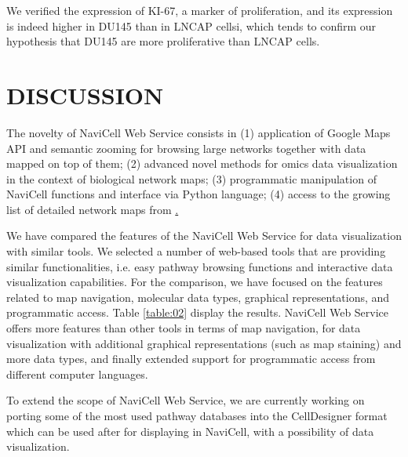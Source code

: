 \documentclass[a4,center,fleqn]{NAR}
\begin{document}
We verified the expression of KI-67, a marker of proliferation, and its
expression is indeed higher in DU145 than in LNCAP cellsi, which tends to
confirm our hypothesis that DU145 are more proliferative than LNCAP cells.


\section{DISCUSSION}

The novelty of NaviCell Web Service consists in (1) application of Google Maps API and semantic zooming for browsing large networks together with data mapped on top of them; (2) advanced novel methods for omics data visualization in the context of biological network maps; (3) programmatic manipulation of NaviCell functions and interface via Python language; (4) access to the growing list of detailed network maps from \href{http://navicell.curie.fr}.

We have compared the features of the NaviCell Web Service for data visualization
with similar tools. We selected a number of web-based tools that are providing
similar functionalities, i.e. easy pathway browsing functions and interactive data
visualization capabilities. For the comparison, we have focused on the features
related to map navigation, molecular data types, graphical representations,
and programmatic access. Table \ref{table:02} display the results. NaviCell Web
Service offers more features than other tools in terms of map navigation, for
data visualization with additional graphical representations (such as map
staining) and more data types, and finally extended support for programmatic
access from different computer languages.


To extend the scope of NaviCell Web Service, we are currently working on porting some of the
most used pathway databases into the CellDesigner format which can be used after for displaying
in NaviCell, with a possibility of data visualization.
\end{document}
